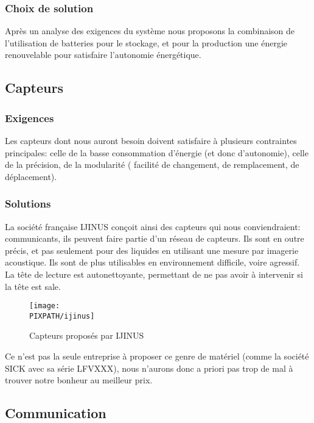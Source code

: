 \subsubsection{Choix de solution}
Après un analyse des exigences du syst\`eme nous proposons la combinaison de l'utilisation de batteries pour le stockage, et pour la production une \'{e}nergie renouvelable pour satisfaire l'autonomie \'{e}nerg\'{e}tique.

\subsection{Capteurs}

\subsubsection{Exigences}
Les capteurs dont nous auront besoin doivent satisfaire à plusieurs
contraintes principales: celle de la basse consommation d'énergie
(et donc d'autonomie), celle de la précision, de la modularité (
facilité de changement, de remplacement, de déplacement).

\subsubsection{Solutions}
La société française IJINUS conçoit ainsi des capteurs qui nous
conviendraient: communicants, ils peuvent faire partie d'un
réseau de capteurs. Ils sont en outre précis, et pas seulement
pour des liquides en utilisant une mesure par imagerie acoustique.
Ils sont de plus utilisables en environnement difficile, voire agressif.
La tête de lecture est autonettoyante, permettant de ne pas avoir
à intervenir si la tête est sale.

\begin{figure}[!h]
\begin{center}

\texttt{[image: \\PIXPATH/ijinus]}
\caption{Capteurs proposés par IJINUS}
\end{center}
\end{figure}

Ce n'est pas la seule entreprise à proposer ce genre de matériel (comme la société SICK avec sa série LFVXXX), nous
n'aurons donc a priori pas trop de mal à trouver notre bonheur au meilleur
prix.


\subsection{Communication}

